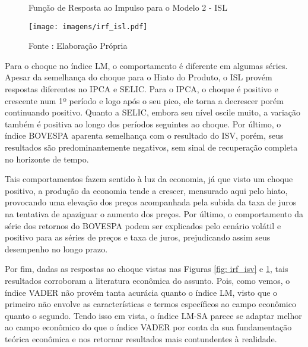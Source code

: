 \begin{figure}[!h]
\centering
\caption{Função de Resposta ao Impulso para o Modelo 2 - ISL}
\label{fig: irf_isl}
\texttt{[image: imagens/irf\_isl.pdf]}
\caption*{Fonte : Elaboração Própria}
\end{figure}

Para o choque no índice LM, o comportamento é diferente em algumas séries. Apesar da semelhança do choque para o Hiato do Produto, o ISL provém respostas diferentes no IPCA e SELIC. Para o IPCA, o choque é positivo e crescente num 1º período e logo após o seu pico, ele torna a decrescer porém continuando positivo. Quanto a SELIC, embora seu nível oscile muito, a variação também é positiva ao longo dos períodos seguintes ao choque. Por último, o índice BOVESPA aparenta semelhança com o resultado do ISV, porém, seus resultados são predominantemente negativos, sem sinal de recuperação completa no horizonte de tempo.

Tais comportamentos fazem sentido à luz da economia, já que visto um choque positivo, a produção da economia tende a crescer, mensurado aqui pelo hiato, provocando uma elevação dos preços acompanhada pela subida da taxa de juros na tentativa de apaziguar o aumento dos preços. Por último, o comportamento da série dos retornos do BOVESPA podem ser explicados pelo cenário volátil e positivo para as séries de preços e taxa de juros, prejudicando assim seus desempenho no longo prazo.

Por fim, dadas as respostas ao choque vistas nas Figuras \ref{fig: irf_isv} e \ref{fig: irf_isl}, tais resultados corroboram a literatura econômica do assunto. Pois, como vemos, o índice VADER não provém tanta acurácia quanto o índice LM, visto que o primeiro não envolve as características e termos específicos ao campo econômico quanto o segundo. Tendo isso em vista, o índice LM-SA parece se adaptar melhor ao campo econômico do que o índice VADER por conta da sua fundamentação teórica econômica e nos retornar resultados mais contundentes à realidade.
